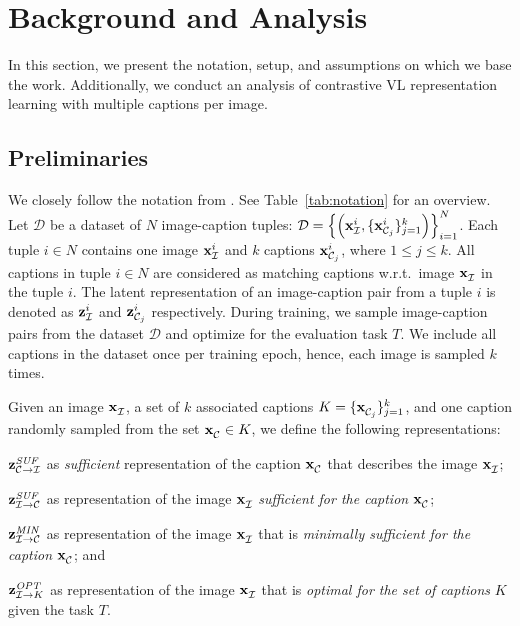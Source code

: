 
\section{Background and Analysis}
\label{sec:background}

In this section, we present the notation, setup, and assumptions on which we base the work. Additionally, we conduct an analysis of contrastive \ac{VL} representation learning with multiple captions per image.

\subsection{Preliminaries}
\label{subsec:notation-assumptions}

 We closely follow the notation from \citep{bleeker2023reducing}. 
See Table~\ref{tab:notation} for an overview.
Let $\mathcal{D}$ be a dataset of $N$ image-caption tuples: $\mathcal{D} = \left\{\left(\img{i}, \{\capt{i}{j}\}_{j=1}^{k} \right)\right\}_{i=1}^{N}$. 
Each tuple $i \in N$ contains one image $\img{i}$ and $k$ captions $\capt{i}{j}$, where $1 \leq j \leq k$. 
All captions in tuple $i \in N$ are considered as matching captions w.r.t.\ image $\img{}$ in the tuple $i$.
The latent representation of an image-caption pair from a tuple $i$ is denoted as $\zimg{i}{}$ and $\zcapt{i}{j}$ respectively.
During training, we sample image-caption pairs from the dataset $\mathcal{D}$ and optimize for the evaluation task $T$. 
We include all captions in the dataset once per training epoch, hence, each image is sampled $k$ times.

Given an image $\img{}$, a set of $k$ associated captions $K = \{\capt{}{j}\}_{j=1}^{k}$, and one caption randomly sampled from the set $\capt{}{} \in K$,
we define the following representations:
\begin{enumerate*}[label=(\roman*)]
	\item $\zcaptsuff{}{}$ as \emph{sufficient} representation of the caption $\capt{}{}$ that describes the image $\img{}$;
	\item $\zimgsuff{}$ as representation of the image $\img{}$ \emph{sufficient for the caption} $\capt{}{}$;
	\item $\zminsuff{}$ as representation of the image $\img{}$ that is \emph{minimally sufficient for the caption} $\capt{}{}$; and
	\item $\zoptimal{}{K}$ as representation of the image $\img{}$ that is \emph{optimal for the set of captions} $K$ given the task $T$.
\end{enumerate*}

